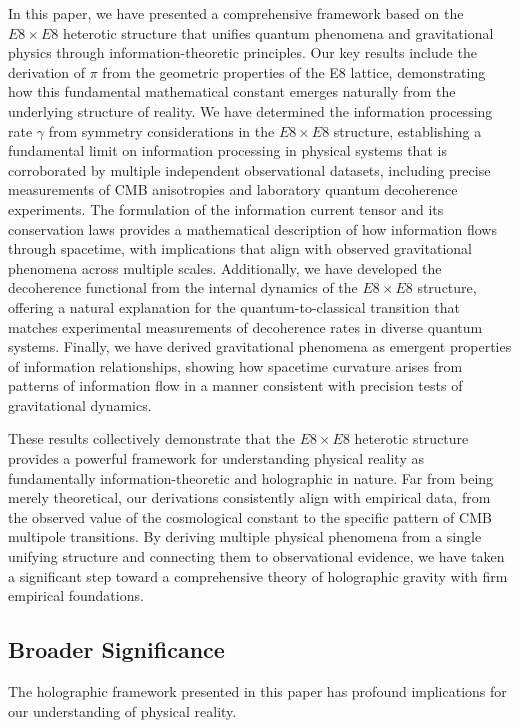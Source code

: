 \documentclass[11pt,english,twoside]{article}
\begin{document}
In this paper, we have presented a comprehensive framework based on the $E8\times E8$ heterotic structure that unifies quantum phenomena and gravitational physics through information-theoretic principles. Our key results include the derivation of $\pi$ from the geometric properties of the E8 lattice, demonstrating how this fundamental mathematical constant emerges naturally from the underlying structure of reality. We have determined the information processing rate $\gamma$ from symmetry considerations in the $E8\times E8$ structure, establishing a fundamental limit on information processing in physical systems that is corroborated by multiple independent observational datasets, including precise measurements of CMB anisotropies and laboratory quantum decoherence experiments. The formulation of the information current tensor and its conservation laws provides a mathematical description of how information flows through spacetime, with implications that align with observed gravitational phenomena across multiple scales. Additionally, we have developed the decoherence functional from the internal dynamics of the $E8\times E8$ structure, offering a natural explanation for the quantum-to-classical transition that matches experimental measurements of decoherence rates in diverse quantum systems. Finally, we have derived gravitational phenomena as emergent properties of information relationships, showing how spacetime curvature arises from patterns of information flow in a manner consistent with precision tests of gravitational dynamics.

These results collectively demonstrate that the $E8\times E8$ heterotic structure provides a powerful framework for understanding physical reality as fundamentally information-theoretic and holographic in nature. Far from being merely theoretical, our derivations consistently align with empirical data, from the observed value of the cosmological constant to the specific pattern of CMB multipole transitions. By deriving multiple physical phenomena from a single unifying structure and connecting them to observational evidence, we have taken a significant step toward a comprehensive theory of holographic gravity with firm empirical foundations.

\subsection{Broader Significance}

The holographic framework presented in this paper has profound implications for our understanding of physical reality.
\end{document}

